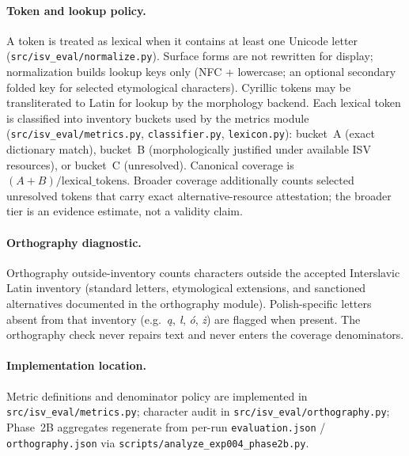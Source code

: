 \paragraph{Token and lookup policy.}
A token is treated as lexical when it contains at least one Unicode letter (\texttt{src/isv\_eval/normalize.py}).
Surface forms are not rewritten for display; normalization builds lookup keys only (NFC + lowercase; an optional secondary folded key for selected etymological characters).
Cyrillic tokens may be transliterated to Latin for lookup by the morphology backend.
Each lexical token is classified into inventory buckets used by the metrics module (\texttt{src/isv\_eval/metrics.py}, \texttt{classifier.py}, \texttt{lexicon.py}):
bucket~A (exact dictionary match), bucket~B (morphologically justified under available ISV resources), or bucket~C (unresolved).
Canonical coverage is $(A+B)/\text{lexical\_tokens}$.
Broader coverage additionally counts selected unresolved tokens that carry exact alternative-resource attestation; the broader tier is an evidence estimate, not a validity claim.

\paragraph{Orthography diagnostic.}
Orthography outside-inventory counts characters outside the accepted Interslavic Latin inventory (standard letters, etymological extensions, and sanctioned alternatives documented in the orthography module).
Polish-specific letters absent from that inventory (e.g.\ \emph{\k{a}}, \emph{\l{}}, \emph{\'{o}}, \emph{\.{z}}) are flagged when present.
The orthography check never repairs text and never enters the coverage denominators.

\paragraph{Implementation location.}
Metric definitions and denominator policy are implemented in \texttt{src/isv\_eval/metrics.py}; character audit in \texttt{src/isv\_eval/orthography.py}; Phase~2B aggregates regenerate from per-run \texttt{evaluation.json} / \texttt{orthography.json} via \texttt{scripts/analyze\_exp004\_phase2b.py}.

